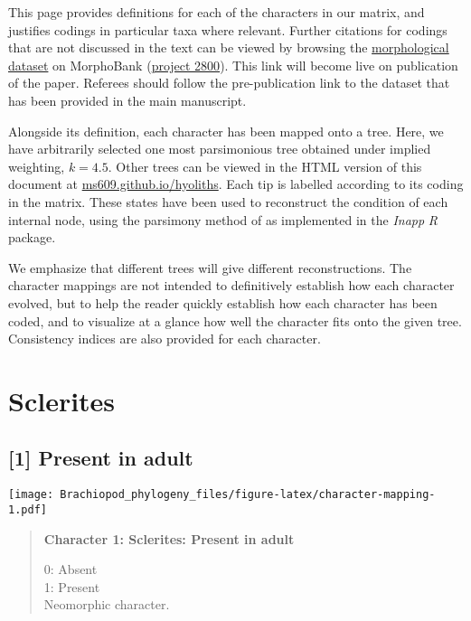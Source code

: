 \documentclass[openany]{book}
\theoremstyle{definition}
\theoremstyle{definition}
\theoremstyle{definition}
\theoremstyle{remark}
\begin{document}
This page provides definitions for each of the characters in our matrix,
and justifies codings in particular taxa where relevant. Further
citations for codings that are not discussed in the text can be viewed
by browsing the \protect\hyperlink{dataset}{morphological dataset} on
MorphoBank (\href{https://morphobank.org/permalink/?P2800}{project
2800}). This link will become live on publication of the paper. Referees
should follow the pre-publication link to the dataset that has been
provided in the main manuscript.

Alongside its definition, each character has been mapped onto a tree.
Here, we have arbitrarily selected one most parsimonious tree obtained
under implied weighting, \(k = 4.5\). Other trees can be viewed in the
HTML version of this document at
\href{https://ms609.github.io/hyoliths/reconstructions.html}{ms609.github.io/hyoliths}.
Each tip is labelled according to its coding in the matrix. These states
have been used to reconstruct the condition of each internal node, using
the parsimony method of \citet{Brazeau2018} as implemented in the
\emph{Inapp} \emph{R} package.

We emphasize that different trees will give different reconstructions.
The character mappings are not intended to definitively establish how
each character evolved, but to help the reader quickly establish how
each character has been coded, and to visualize at a glance how well the
character fits onto the given tree. Consistency indices
\citep{Archie1989} are also provided for each character.

\section{Sclerites}\label{sclerites}

\subsection*{{[}1{]} Present in adult}\label{present-in-adult}

\texttt{[image: Brachiopod\_phylogeny\_files/figure-latex/character-mapping-1.pdf]}

\begin{quote}
\textbf{Character 1: Sclerites: Present in adult}

0: Absent\\
1: Present\\
Neomorphic character.
\end{quote}
\end{document}
